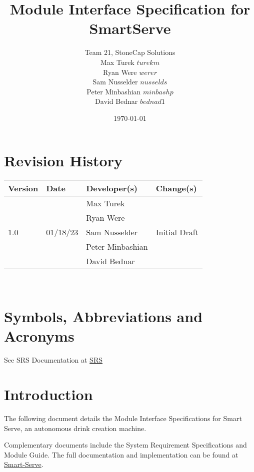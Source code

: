 \documentclass[12pt, titlepage]{article}
\newcommand{\progname}{SmartServe} %
\newcommand{\authname}{Team 21, StoneCap Solutions
\\ Max Turek $turekm$
\\ Ryan Were $werer$
\\ Sam Nusselder $nusselds$
\\ Peter Minbashian $minbashp$
\\ David Bednar $bednad1$} %
\begin{document}
\title{Module Interface Specification for \progname{}}

\author{\authname}

\date{\today}

\maketitle


\section{Revision History}

\begin{tabularx}{\textwidth}{| s | s | s | X |}
        \toprule
        \textbf{Version} & \textbf{Date} & \textbf{Developer(s)} & \textbf{Change(s)}\\
        \midrule
         & & Max Turek & \\
         & & Ryan Were & \\
        1.0 & 01/18/23 & Sam Nusselder & Initial Draft\\
         & & Peter Minbashian & \\ 
         & & David Bednar & \\ 
        \bottomrule
        \hline
\end{tabularx}

~\newpage

\section{Symbols, Abbreviations and Acronyms}

See SRS Documentation at \href{https://github.com/purefisher/Smart-Serve/blob/main/docs/SRS/SRS.pdf}{SRS}

\newpage

\tableofcontents

\newpage


\section{Introduction}

The following document details the Module Interface Specifications for
Smart Serve, an autonomous drink creation machine. 

Complementary documents include the System Requirement Specifications
and Module Guide.  The full documentation and implementation can be
found at \href{https://github.com/purefisher/Smart-Serve}{Smart-Serve}.
\end{document}
